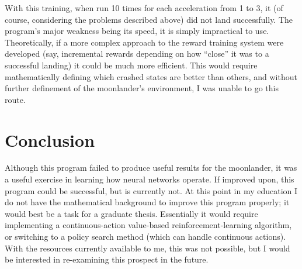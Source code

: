 \documentclass[12pt, article]{scrartcl}
\begin{document}
With this training, when run 10 times for each acceleration from 1 to 3, it (of course, considering the problems described above) did not land successfully. The program's major weakness being its speed, it is simply impractical to use. Theoretically, if a more complex approach to the reward training system were developed (say, incremental rewards depending on how ``close'' it was to a successful landing) it could be much more efficient. This would require mathematically defining which crashed states are better than others, and without further definement of the moonlander's environment, I was unable to go this route.

\section{Conclusion}
Although this program failed to produce useful results for the moonlander, it was a useful exercise in learning how neural networks operate. If improved upon, this program could be successful, but is currently not. At this point in my education I do not have the mathematical background to improve this program properly; it would best be a task for a graduate thesis. Essentially it would require implementing a continuous-action value-based reinforcement-learning algorithm, or switching to a policy search method (which can handle continuous actions). With the resources currently available to me, this was not possible, but I would be interested in re-examining this prospect in the future.
\end{document}
